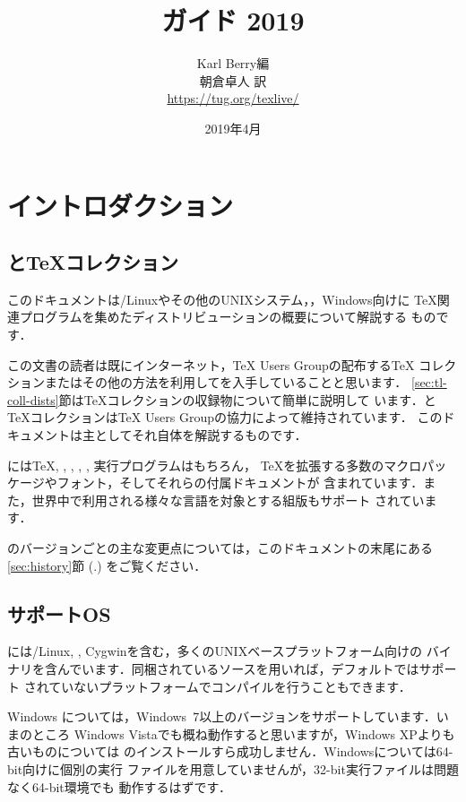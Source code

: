\documentclass[uplatex,dvipdfmx]{jsarticle}
\title{{\huge {\TL ガイド 2019}}}
\author{%
  Karl Berry編 \\
  朝倉卓人 訳 \\[3mm]
  \url{https://tug.org/texlive/}
}
\date{2019年4月}
\begin{document}
\maketitle
\thispagestyle{empty}

\begin{multicols}{1}
\tableofcontents
\end{multicols}

\section{イントロダクション}\label{sec:intro}

\subsection{\TL と\TeX コレクション}

このドキュメントは\GNU/Linuxやその他のUNIXシステム，\macOS，Windows向けに
\TeX 関連プログラムを集めたディストリビューション\TL の概要について解説する
ものです．

この文書の読者は既にインターネット，{\TeX} Users Groupの配布する\TeX
コレクション\DVD またはその他の方法を利用して\TL を入手していることと思います．
\ref{sec:tl-coll-dists}節は\TeX コレクション\DVD の収録物について簡単に説明して
います．\TL と\TeX コレクションは{\TeX} Users Groupの協力によって維持されています．
このドキュメントは主として\TL それ自体を解説するものです．

\TL には\TeX, \LaTeXe, \ConTeXt, \MF, \MP, \BibTeX 実行プログラムはもちろん，
\TeX を拡張する多数のマクロパッケージやフォント，そしてそれらの付属ドキュメントが
含まれています．また，世界中で利用される様々な言語を対象とする組版もサポート
されています．

\TL のバージョンごとの主な変更点については，このドキュメントの末尾にある
\ref{sec:history}節 (\p.\pageref{sec:history}) をご覧ください．

\subsection{サポートOS}
\label{sec:os-support}

\TL には\GNU/Linux, \macOS, Cygwinを含む，多くのUNIXベースプラットフォーム向けの
バイナリを含んでいます．同梱されているソースを用いれば，デフォルトではサポート
されていないプラットフォームでコンパイルを行うこともできます．

Windows については，Windows~7以上のバージョンをサポートしています．いまのところ
Windows Vistaでも概ね動作すると思いますが，Windows XPよりも古いものについては
\TL のインストールすら成功しません．Windowsについては64-bit向けに個別の実行
ファイルを用意していませんが，32-bit実行ファイルは問題なく64-bit環境でも
動作するはずです．
\end{document}
